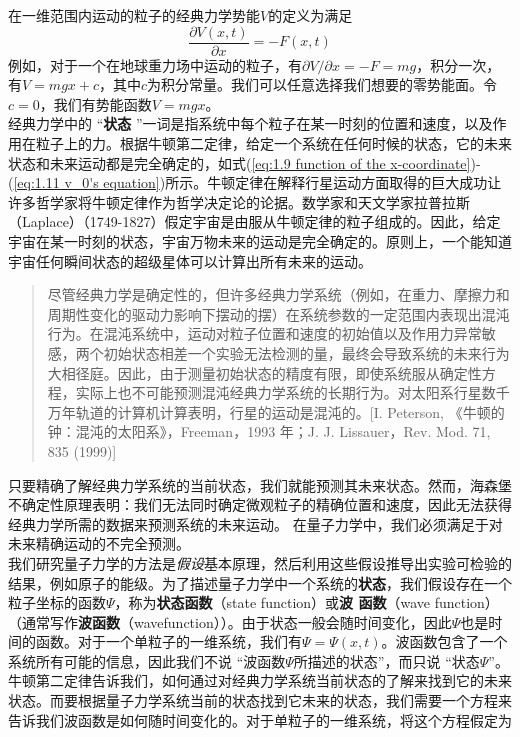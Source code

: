 	 \indent 在一维范围内运动的粒子的经典力学势能$V$的定义为满足
	 \begin{equation}
	 	\boxed{\frac{\partial V \left(x,t\right)}{\partial x} = -F\left(x,t\right)}
	 	\label{eq:1.12 Potential energy in classical mechanics}
	 \end{equation}
	 例如，对于一个在地球重力场中运动的粒子，有$\partial V / \partial x = -F = mg$，积分一次，有$V = mgx+c$，其中$c$为积分常量。我们可以任意选择我们想要的零势能面。令$c=0$，我们有势能函数$V=mgx$。\\
	 \indent 经典力学中的 “\textbf{状态} ”一词是指系统中每个粒子在某一时刻的位置和速度，以及作用在粒子上的力。根据牛顿第二定律，给定一个系统在任何时候的状态，它的未来状态和未来运动都是完全确定的，如式(\ref{eq:1.9 function of the x-coordinate})-(\ref{eq:1.11 v_0's equation})所示。牛顿定律在解释行星运动方面取得的巨大成功让许多哲学家将牛顿定律作为哲学决定论的论据。数学家和天文学家拉普拉斯（Laplace）（1749-1827）假定宇宙是由服从牛顿定律的粒子组成的。因此，给定宇宙在某一时刻的状态，宇宙万物未来的运动是完全确定的。原则上，一个能知道宇宙任何瞬间状态的超级星体可以计算出所有未来的运动。
	\begin{quote}
		\small %
		\noindent %
		尽管经典力学是确定性的，但许多经典力学系统（例如，在重力、摩擦力和周期性变化的驱动力影响下摆动的摆）在系统参数的一定范围内表现出混沌行为。在混沌系统中，运动对粒子位置和速度的初始值以及作用力异常敏感，两个初始状态相差一个实验无法检测的量，最终会导致系统的未来行为大相径庭。因此，由于测量初始状态的精度有限，即使系统服从确定性方程，实际上也不可能预测混沌经典力学系统的长期行为。对太阳系行星数千万年轨道的计算机计算表明，行星的运动是混沌的。[I. Peterson, 《牛顿的钟：混沌的太阳系》，Freeman，1993 年；J. J. Lissauer，Rev. Mod. 71, 835 (1999)]
	\end{quote}
	\indent 
	\indent 只要精确了解经典力学系统的当前状态，我们就能预测其未来状态。然而，海森堡不确定性原理表明：我们无法同时确定微观粒子的精确位置和速度，因此无法获得经典力学所需的数据来预测系统的未来运动。 在量子力学中，我们必须满足于对未来精确运动的不完全预测。\\
	\indent 我们研究量子力学的方法是\textit{假设}基本原理，然后利用这些假设推导出实验可检验的结果，例如原子的能级。为了描述量子力学中一个系统的\textbf{状态}，我们假设存在一个粒子坐标的函数$\Psi$，称为\textbf{状态函数}（state function）或\textbf{波 函数}（wave function）（通常写作\textbf{波函数}（wavefunction））。由于状态一般会随时间变化，因此$\Psi$也是时间的函数。对于一个单粒子的一维系统，我们有$\Psi=\Psi\left(x,t\right)$。波函数包含了一个系统所有可能的信息，因此我们不说 “波函数$\Psi$所描述的状态”，而只说 “状态$\Psi$”。 牛顿第二定律告诉我们，如何通过对经典力学系统当前状态的了解来找到它的未来状态。而要根据量子力学系统当前的状态找到它未来的状态，我们需要一个方程来告诉我们波函数是如何随时间变化的。对于单粒子的一维系统，将这个方程假定为
